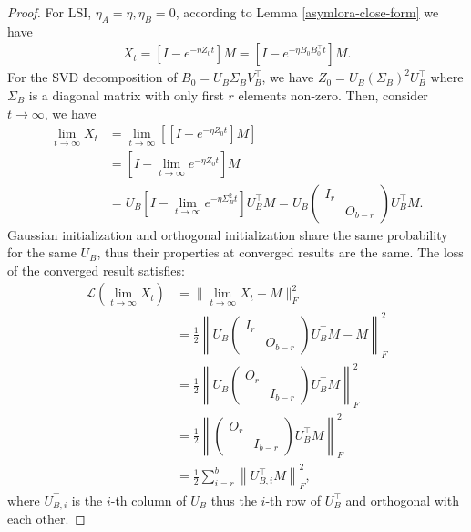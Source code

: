 \begin{proof}
    For LSI, $\eta_A=\eta,\eta_B=0$, according to Lemma \ref{asymlora-close-form} we have
    \begin{align}
        X_t=\left[I-e^{-\eta Z_0t}\right]M=\left[I-e^{-\eta B_0B_0^\top t}\right]M.
    \end{align}
    For the SVD decomposition of $B_0=U_B\Sigma_BV_B^\top$, we have $Z_0=U_B(\Sigma_B)^2U_B^\top$ where $\Sigma_B$ is a diagonal matrix with only first $r$ elements non-zero. Then, consider $t\to\infty$, we have
    \begin{align}
        \lim_{t\to\infty}X_t&=\lim_{t\to\infty}\left[\left[I-e^{-\eta Z_0t}\right]M\right]\\
        &=\left[I-\lim_{t\to\infty}e^{-\eta Z_0t}\right]M\\
        &=U_B\left[I-\lim_{t\to\infty}e^{-\eta \Sigma_B^2t}\right]U_B^\top M=U_B\begin{pmatrix}
            I_r\\&O_{b-r}
        \end{pmatrix}U_B^\top M.
        \label{asym-close-form}
    \end{align}
    Gaussian initialization and orthogonal initialization share the same probability for the same $U_B$, thus their properties at converged results are the same. The loss of the converged result satisfies:
    \begin{align}
        \mathcal{L}(\lim_{t\to\infty}X_t)&=\|\lim_{t\to\infty}X_t-M\|_F^2\\
        &=\frac{1}{2}\left\|U_B\begin{pmatrix}
            I_r\\&O_{b-r}
        \end{pmatrix}U_B^\top M-M\right\|_F^2\\
        &=\frac{1}{2}\left\|U_B\begin{pmatrix}
            O_r\\&I_{b-r}
        \end{pmatrix}U_B^\top M\right\|_F^2\\
        &=\frac{1}{2}\left\|\begin{pmatrix}
            O_r\\&I_{b-r}
        \end{pmatrix}U_B^\top M\right\|_F^2\\
        &=\frac{1}{2}\sum_{i=r}^{b}\left\|U_{B,i}^\top M\right\|_F^2,
    \end{align}
    where $U_{B,i}^\top$ is the $i$-th column of $U_B$ thus the $i$-th row of $U_B^\top$ and orthogonal with each other.

\end{proof}
